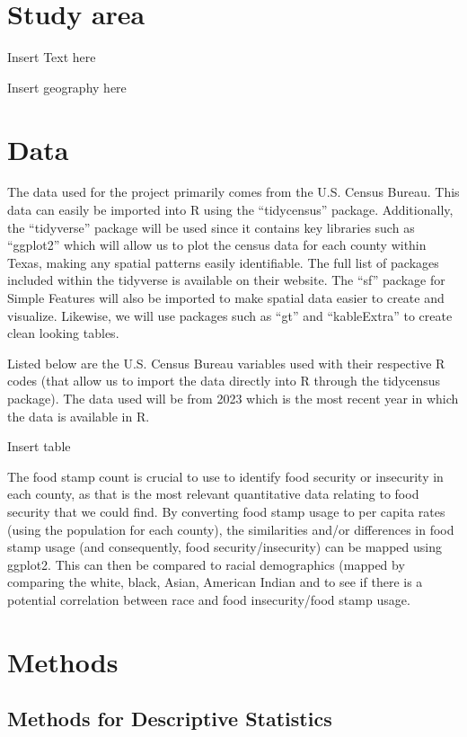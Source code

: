 \documentclass[]{article}
\begin{document}
\section{Study area}\label{study-area}

Insert Text here

Insert geography here

\section{Data}\label{data}

The data used for the project primarily comes from the U.S. Census
Bureau. This data can easily be imported into R using the ``tidycensus''
package. Additionally, the ``tidyverse'' package will be used since it
contains key libraries such as ``ggplot2'' which will allow us to plot
the census data for each county within Texas, making any spatial
patterns easily identifiable. The full list of packages included within
the tidyverse is available on their website. The ``sf'' package for
Simple Features will also be imported to make spatial data easier to
create and visualize. Likewise, we will use packages such as ``gt'' and
``kableExtra'' to create clean looking tables.

Listed below are the U.S. Census Bureau variables used with their
respective R codes (that allow us to import the data directly into R
through the tidycensus package). The data used will be from 2023 which
is the most recent year in which the data is available in R.

Insert table

The food stamp count is crucial to use to identify food security or
insecurity in each county, as that is the most relevant quantitative
data relating to food security that we could find. By converting food
stamp usage to per capita rates (using the population for each county),
the similarities and/or differences in food stamp usage (and
consequently, food security/insecurity) can be mapped using ggplot2.
This can then be compared to racial demographics (mapped by comparing
the white, black, Asian, American Indian and to see if there is a
potential correlation between race and food insecurity/food stamp usage.

\section{Methods}\label{methods}

\subsection{Methods for Descriptive
Statistics}\label{methods-for-descriptive-statistics}
\end{document}
